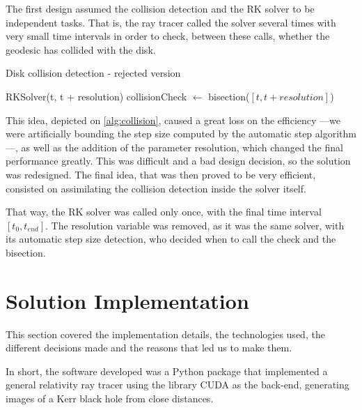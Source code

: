 The first design assumed the collision detection and the \ac{RK} solver to be independent tasks. That is, the ray tracer called the solver several times with very small time intervals in order to check, between these calls, whether the geodesic has collided with the disk.

\begin{algorithm}
	\caption{Disk collision detection - rejected version}
	\label{alg:collision}
	\begin{algorithmic}[1]
		\State RKSolver(t, t + resolution)
		\State collisionCheck $\gets$ bisection($[t, t + resolution]$)
		\EndIf
		\EndFor
		\EndFunction
	\end{algorithmic}
\end{algorithm}

This idea, depicted on \ref{alg:collision}, caused a great loss on the efficiency ---we were artificially bounding the step size computed by the automatic step algorithm---, as well as the addition of the parameter resolution, which changed the final performance greatly. This was difficult and a bad design decision, so the solution was redesigned. The final idea, that was then proved to be very efficient, consisted on assimilating the collision detection inside the solver itself.

That way, the \ac{RK} solver was called only once, with the final time interval $[t_0, t_{end}]$. The resolution variable was removed, as it was the same solver, with its automatic step size detection, who decided when to call the check and the bisection.

















\section{Solution Implementation}
\label{chapter:implementation}

This section covered the implementation details, the technologies used, the different decisions made and the reasons that led us to make them.

In short, the software developed was a Python package that implemented a general relativity ray tracer using the library \ac{CUDA} as the back-end, generating images of a Kerr black hole from close distances.

